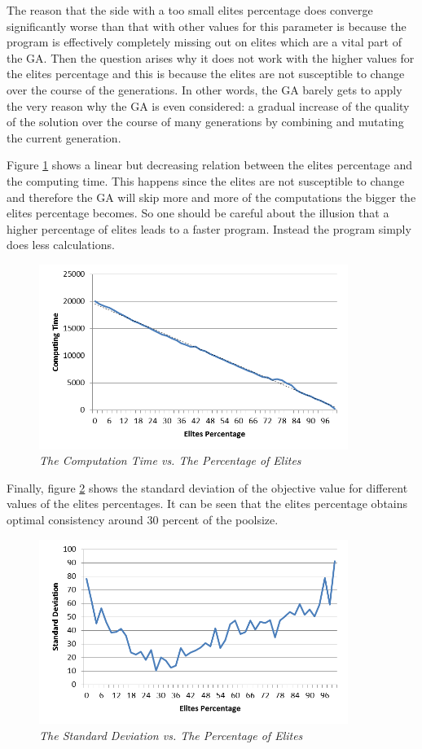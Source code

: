 \par 
The reason that the side with a too small elites percentage does converge significantly worse than that with other values for this parameter is because the program is effectively completely missing out on elites which are a vital part of the GA. Then the question arises why it does not work with the higher values for the elites percentage and this is because the elites are not susceptible to change over the course of the generations. In other words, the GA barely gets to apply the very reason why the GA is even considered: a gradual increase of the quality of the solution over the course of many generations by combining and mutating the current generation.
\par
Figure \ref{CTEP} shows a linear but decreasing relation between the elites percentage and the computing time. This happens since the elites are not susceptible to change and therefore the GA will skip more and more of the computations the bigger the elites percentage becomes. So one should be careful about the illusion that a higher percentage of elites leads to a faster program. Instead the program simply does less calculations.

\begin{figure}[h] 
	\centering
	\includegraphics[height=6cm]{CTEP}
	\caption{\textsl{The Computation Time vs. The Percentage of Elites}}
	\label{CTEP}
\end{figure}

Finally, figure \ref{SDEP} shows the standard deviation of the objective value for different values of the elites percentages. It can be seen that the elites percentage obtains optimal consistency around 30 percent of the poolsize.

\begin{figure}[h] 
	\centering
	\includegraphics[height=6cm]{SDEP}
	\caption{\textsl{The Standard Deviation vs. The Percentage of Elites}}
	\label{SDEP}
\end{figure}




